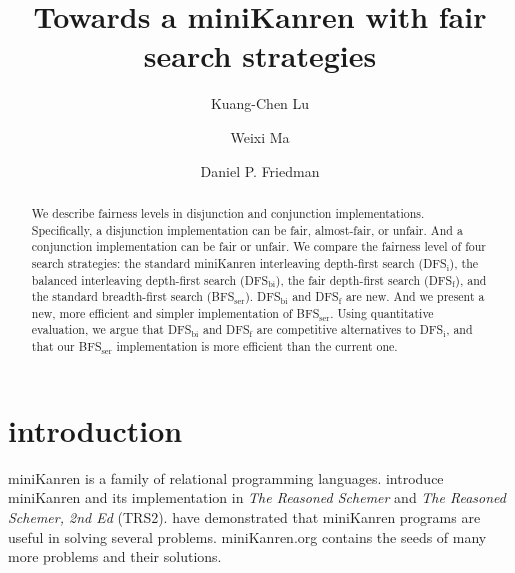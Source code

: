 \documentclass[format=acmlarge, review=true, authordraft=true]{acmart}
\title{Towards a miniKanren with fair search strategies}
\author{Kuang-Chen Lu}
\affiliation{Indiana University}
\author{Weixi Ma}
\affiliation{Indiana University}
\author{Daniel P. Friedman}
\affiliation{Indiana University}
\newcommand{\conde}{\texttt{cond$^e$}}
\newcommand{\conj}{\texttt{conj}}
\newcommand{\disj}{\texttt{disj}}
\newcommand{\DFSi }[0]{DFS$_\textrm{i}$}
\newcommand{\DFSf }[0]{DFS$_\textrm{f}$}
\newcommand{\DFSbi}[0]{DFS$_\textrm{bi}$}
\newcommand{\BFSser}[0]{BFS$_\textrm{ser}$}
\begin{document}

\begin{abstract}

We describe fairness levels in disjunction and conjunction
implementations.  Specifically, a disjunction implementation can be
fair, almost-fair, or unfair. And a conjunction implementation can
be fair or unfair.  We compare the fairness level of four search
strategies: the standard miniKanren interleaving depth-first search (\DFSi),
the balanced interleaving depth-first search (\DFSbi), the fair depth-first
search (\DFSf), and the standard breadth-first search (\BFSser).
\DFSbi{} and \DFSf{} are new. And we present a new, more efficient
and simpler implementation of \BFSser. Using quantitative evaluation, 
we argue that
\DFSbi{} and \DFSf{} are competitive alternatives to \DFSi, 
and that our \BFSser{} implementation is more efficient than the current one.

% 

\end{abstract}

\maketitle

\section{introduction}

miniKanren is a family of relational programming languages.
\citep{Friedman:2005:RS:1121583} \citet{friedman_reasoned_2018} introduce 
miniKanren and its
implementation in \emph{The Reasoned Schemer} 
and \emph{The Reasoned Schemer, 2nd Ed} (TRS2). \citet{byrd2017unified} have 
demonstrated that miniKanren programs are useful in solving several problems.
miniKanren.org contains the seeds of many more problems and their solutions.
\end{document}
